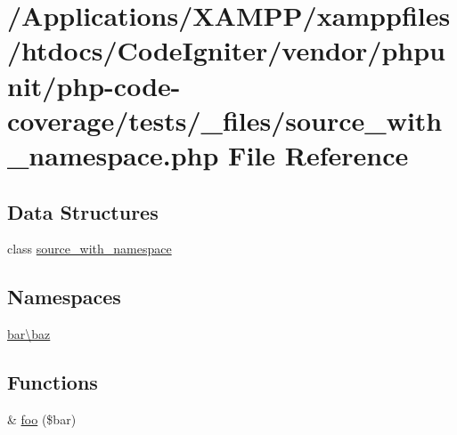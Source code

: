\hypertarget{source__with__namespace_8php}{}\section{/\+Applications/\+X\+A\+M\+P\+P/xamppfiles/htdocs/\+Code\+Igniter/vendor/phpunit/php-\/code-\/coverage/tests/\+\_\+files/source\+\_\+with\+\_\+namespace.php File Reference}
\label{source__with__namespace_8php}
\subsection*{Data Structures}
\begin{DoxyCompactItemize}
\item 
class \mbox{\hyperlink{classbar_1_1baz_1_1source__with__namespace}{source\+\_\+with\+\_\+namespace}}
\end{DoxyCompactItemize}
\subsection*{Namespaces}
\begin{DoxyCompactItemize}
\item 
 \mbox{\hyperlink{namespacebar_1_1baz}{bar\textbackslash{}baz}}
\end{DoxyCompactItemize}
\subsection*{Functions}
\begin{DoxyCompactItemize}
\item 
\& \mbox{\hyperlink{namespacebar_1_1baz_a18d1f863c3b8d8a292b6274fb4a93ae5}{foo}} (\$bar)
\end{DoxyCompactItemize}
